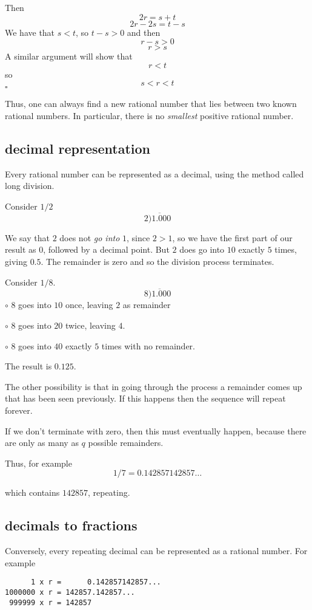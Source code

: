 \documentclass[11pt, oneside]{article}
\begin{document}
Then
\[ 2r = s + t \]
\[ 2r - 2s = t - s \]
We have that $s < t$, so $t - s > 0$ and then
\[ r - s > 0 \]
\[ r  > s \]
A similar argument will show that
\[ r < t \]
so
\[ s < r < t \]
$\square$

Thus, one can always find a new rational number that lies between two known rational numbers.  In particular, there is no \emph{smallest} positive rational number.

\subsection*{decimal representation}

Every rational number can be represented as a decimal, using the method called long division.

Consider $1/2$
\[ 2 \overline{)1.000} \]

We say that $2$ does not \emph{go into} $1$, since $2 > 1$, so we have the first part of our result as $0$, followed by a decimal point.  But $2$ does go into $10$ exactly $5$ times, giving $0.5$.  The remainder is zero and so the division process terminates.

Consider $1/8$.
\[ 8 \overline{)1.000} \]
$\circ$  $8$ goes into $10$ once, leaving $2$ as remainder

$\circ$  $8$ goes into $20$ twice, leaving $4$.  

$\circ$  $8$ goes into $40$ exactly $5$ times with no remainder.

The result is $0.125$.

The other possibility is that in going through the process a remainder comes up that has been seen previously.  If this happens then the sequence will repeat forever.

If we don't terminate with zero, then this must eventually happen, because there are only as many as $q$ possible remainders.

Thus, for example
\[ 1/7 = 0.142857142857 \dots \]

which contains $142857$, repeating.

\subsection*{decimals to fractions}

Conversely, every repeating decimal can be represented as a rational number.  For example

\begin{verbatim}
      1 x r =      0.142857142857...
1000000 x r = 142857.142857...
 999999 x r = 142857
\end{verbatim}
\end{document}
